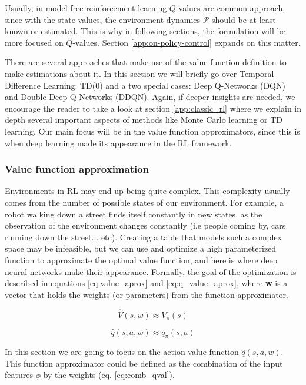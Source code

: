 Usually, in model-free reinforcement learning ${Q}$-values are common approach, since with the state values, the environment dynamics $\mathcal{P}$ should be at least known or estimated. This is why in following sections, the formulation will be more focused on ${Q}$-values. Section \ref{app:on-policy-control} expands on this matter.

There are several approaches that make use of the value function definition to make estimations about it. In this section we will briefly go over Temporal Difference Learning: TD(0) and a two special cases: Deep Q-Networks (DQN) and Double Deep Q-Networks (DDQN). Again, if deeper insights are needed, we encourage the reader to take a look at section \ref{app:classic_rl} where we explain in depth several important aspects of methods like Monte Carlo learning or TD learning. Our main focus will be in the value function approximators, since this is when deep learning made its appearance in the RL framework.

\subsubsection{Value function approximation} 
\label{sec:val-fun_approx}

Environments in RL may end up being quite complex. This complexity usually comes from the number of possible states of our environment. For example, a robot walking down a street finds itself constantly in new states, as the observation of the environment changes constantly (i.e people coming by, cars running down the street... etc). Creating a table that models such a complex space may be infeasible, but we can use and optimize a high parameterized function to approximate the optimal value function, and here is where deep neural networks make their appearance. Formally, the goal of the optimization is described in equations \ref{eq:value_aprox} and \ref{eq:q_value_aprox}, where \textbf{w} is a vector that holds the weights (or parameters) from the function approximator.

\begin{equation}\label{eq:value_aprox}
	\hat{V}(s,w) \approx V_{\pi}(s)
\end{equation}

\begin{equation}\label{eq:q_value_aprox}
	\hat{q}(s,a,w) \approx q_{\pi}(s,a)
\end{equation}

In this section we are going to focus on the action value function $\hat{q}(s,a,w)$. This function approximator could be defined as the combination of the input features $\phi$ by the weights (eq. \ref{eq:comb_qval}).

